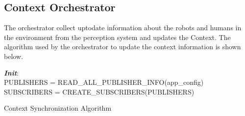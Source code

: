 \subsection*{Context Orchestrator} The orchestrator collect uptodate information about the robots and humans in the environment from the perception system and updates the Context. The algorithm used by the orchestrator to update the context information is shown below.

\begin{algorithm}[H]
 \textbf{\emph{Init}}:\\
 \quad PUBLISHERS = READ\_ALL\_PUBLISHER\_INFO(app\_config)\;
 \quad SUBSCRIBERS = CREATE\_SUBSCRIBERS(PUBLISHERS)\;
 \caption{Context Synchronization Algorithm}
 \label{alg:context_sync}
\end{algorithm}
